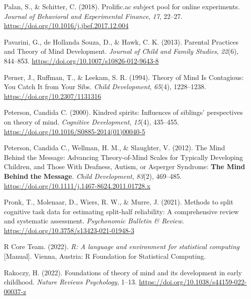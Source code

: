 \documentclass[
  man,floatsintext]{apa6}
\newlength{\cslhangindent}
\newlength{\cslentryspacingunit} %
\newenvironment{CSLReferences}[2] %
 {%
  \setlength{\parindent}{0pt}
  \ifodd #1
  \let\oldpar\par
  \def\par{\hangindent=\cslhangindent\oldpar}
  \fi
  \setlength{\parskip}{#2\cslentryspacingunit}
 }%
 {}
\begin{document}
\begin{CSLReferences}{1}{0}
\leavevmode{}%
Palan, S., \& Schitter, C. (2018). Prolific.ac subject pool for online experiments. \emph{Journal of Behavioral and Experimental Finance}, \emph{17}, 22--27. \url{https://doi.org/10.1016/j.jbef.2017.12.004}

\leavevmode{}%
Pavarini, G., de Hollanda Souza, D., \& Hawk, C. K. (2013). Parental {Practices} and {Theory} of {Mind Development}. \emph{Journal of Child and Family Studies}, \emph{22}(6), 844--853. \url{https://doi.org/10.1007/s10826-012-9643-8}

\leavevmode{}%
Perner, J., Ruffman, T., \& Leekam, S. R. (1994). Theory of {Mind Is Contagious}: {You Catch It} from {Your Sibs}. \emph{Child Development}, \emph{65}(4), 1228--1238. \url{https://doi.org/10.2307/1131316}

\leavevmode{}%
Peterson, Candida C. (2000). Kindred spirits: {Influences} of siblings' perspectives on theory of mind. \emph{Cognitive Development}, \emph{15}(4), 435--455. \url{https://doi.org/10.1016/S0885-2014(01)00040-5}

\leavevmode{}%
Peterson, Candida C., Wellman, H. M., \& Slaughter, V. (2012). The {Mind Behind} the {Message}: {Advancing Theory-of-Mind Scales} for {Typically Developing Children}, and {Those With Deafness}, {Autism}, or {Asperger Syndrome}: {\textbf{The Mind Behind}}{ \textbf{the} }{\textbf{Message}}. \emph{Child Development}, \emph{83}(2), 469--485. \url{https://doi.org/10.1111/j.1467-8624.2011.01728.x}

\leavevmode{}%
Pronk, T., Molenaar, D., Wiers, R. W., \& Murre, J. (2021). Methods to split cognitive task data for estimating split-half reliability: {A} comprehensive review and systematic assessment. \emph{Psychonomic Bulletin \& Review}. \url{https://doi.org/10.3758/s13423-021-01948-3}

\leavevmode{}%
R Core Team. (2022). \emph{R: {A} language and environment for statistical computing} {[}Manual{]}. {Vienna, Austria}: {R Foundation for Statistical Computing}.

\leavevmode{}%
Rakoczy, H. (2022). Foundations of theory of mind and its development in early childhood. \emph{Nature Reviews Psychology}, 1--13. \url{https://doi.org/10.1038/s44159-022-00037-z}


\end{CSLReferences}
\end{document}
